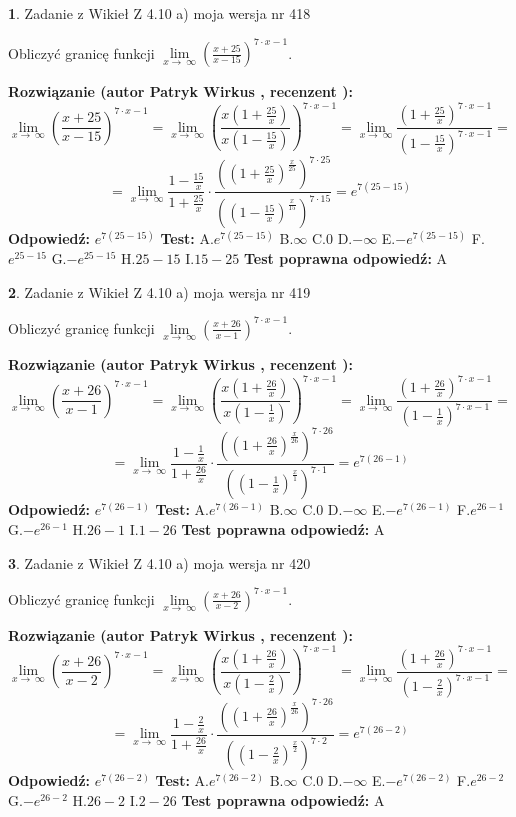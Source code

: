 \documentclass[12pt, a4paper]{article}
\theoremstyle{definition} %
\newtheorem{zad}{}
\newcommand{\zadStart}[1]{\begin{zad}#1\newline}
\newcommand{\zadStop}{\end{zad}}
\newcommand{\rozwStart}[2]{\noindent \textbf{Rozwiązanie (autor #1 , recenzent #2): }\newline}
\newcommand{\rozwStop}{\newline}
\newcommand{\odpStart}{\noindent \textbf{Odpowiedź:}\newline}
\newcommand{\odpStop}{\newline}
\newcommand{\testStart}{\noindent \textbf{Test:}\newline}
\newcommand{\testStop}{\newline}
\newcommand{\kluczStart}{\noindent \textbf{Test poprawna odpowiedź:}\newline}
\newcommand{\kluczStop}{\newline}
\begin{document}
\zadStart{Zadanie z Wikieł Z 4.10 a) moja wersja nr 418}


Obliczyć granicę funkcji  $\lim\limits_{x\to\ \infty}(\frac{x+25}{x-15})^{7\cdot x-1}$.
\zadStop
\rozwStart{Patryk Wirkus}{}
$$\lim\limits_{x\to\ \infty}(\frac{x+25}{x-15})^{7\cdot x-1} = \lim\limits_{x\to\ \infty}(\frac{x(1+\frac{25}{x})}{x(1-\frac{15}{x})})^{7\cdot x-1}=\lim\limits_{x\to\ \infty}\frac{(1+\frac{25}{x})^{7\cdot x-1}}{(1-\frac{15}{x})^{7\cdot x-1}}=$$
$$=\lim\limits_{x\to\ \infty}\frac{1-\frac{15}{x}}{1+\frac{25}{x}}\cdot\frac{((1+\frac{25}{x})^{\frac{x}{25}})^{7\cdot25}}{((1-\frac{15}{x})^{\frac{x}{15}})^{7\cdot15}}=e^{7(25-15)}$$
\rozwStop
\odpStart
$e^{7(25-15)}$
\odpStop
\testStart
A.$e^{7(25-15)}$ B.$\infty$ C.$0$ D.$-\infty$ E.$-e^{7(25-15)}$
F.$e^{25-15}$ G.$-e^{25-15}$
H.$25-15$
I.$15-25$
\testStop
\kluczStart
A
\kluczStop



\zadStart{Zadanie z Wikieł Z 4.10 a) moja wersja nr 419}


Obliczyć granicę funkcji  $\lim\limits_{x\to\ \infty}(\frac{x+26}{x-1})^{7\cdot x-1}$.
\zadStop
\rozwStart{Patryk Wirkus}{}
$$\lim\limits_{x\to\ \infty}(\frac{x+26}{x-1})^{7\cdot x-1} = \lim\limits_{x\to\ \infty}(\frac{x(1+\frac{26}{x})}{x(1-\frac{1}{x})})^{7\cdot x-1}=\lim\limits_{x\to\ \infty}\frac{(1+\frac{26}{x})^{7\cdot x-1}}{(1-\frac{1}{x})^{7\cdot x-1}}=$$
$$=\lim\limits_{x\to\ \infty}\frac{1-\frac{1}{x}}{1+\frac{26}{x}}\cdot\frac{((1+\frac{26}{x})^{\frac{x}{26}})^{7\cdot26}}{((1-\frac{1}{x})^{\frac{x}{1}})^{7\cdot1}}=e^{7(26-1)}$$
\rozwStop
\odpStart
$e^{7(26-1)}$
\odpStop
\testStart
A.$e^{7(26-1)}$ B.$\infty$ C.$0$ D.$-\infty$ E.$-e^{7(26-1)}$
F.$e^{26-1}$ G.$-e^{26-1}$
H.$26-1$
I.$1-26$
\testStop
\kluczStart
A
\kluczStop



\zadStart{Zadanie z Wikieł Z 4.10 a) moja wersja nr 420}


Obliczyć granicę funkcji  $\lim\limits_{x\to\ \infty}(\frac{x+26}{x-2})^{7\cdot x-1}$.
\zadStop
\rozwStart{Patryk Wirkus}{}
$$\lim\limits_{x\to\ \infty}(\frac{x+26}{x-2})^{7\cdot x-1} = \lim\limits_{x\to\ \infty}(\frac{x(1+\frac{26}{x})}{x(1-\frac{2}{x})})^{7\cdot x-1}=\lim\limits_{x\to\ \infty}\frac{(1+\frac{26}{x})^{7\cdot x-1}}{(1-\frac{2}{x})^{7\cdot x-1}}=$$
$$=\lim\limits_{x\to\ \infty}\frac{1-\frac{2}{x}}{1+\frac{26}{x}}\cdot\frac{((1+\frac{26}{x})^{\frac{x}{26}})^{7\cdot26}}{((1-\frac{2}{x})^{\frac{x}{2}})^{7\cdot2}}=e^{7(26-2)}$$
\rozwStop
\odpStart
$e^{7(26-2)}$
\odpStop
\testStart
A.$e^{7(26-2)}$ B.$\infty$ C.$0$ D.$-\infty$ E.$-e^{7(26-2)}$
F.$e^{26-2}$ G.$-e^{26-2}$
H.$26-2$
I.$2-26$
\testStop
\kluczStart
A
\kluczStop
\end{document}
